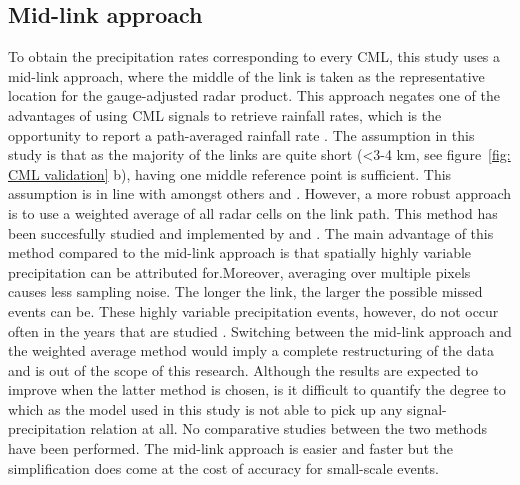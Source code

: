 \documentclass[twocolumn, 10pt, a4paper]{memoir}
\begin{document}
	\subsection{Mid-link approach} \label{sec: middle link}
	To obtain the precipitation rates corresponding to every CML, this study uses a mid-link approach, where the middle of the link is taken as the representative location for the gauge-adjusted radar product. This approach negates one of the advantages of using CML signals to retrieve rainfall rates, which is the opportunity to report a path-averaged rainfall rate \cite{Pudashine2020}. The assumption in this study is that as the majority of the links are quite short (<3-4 km, see figure~\ref{fig: CML validation} b), having one middle reference point is sufficient. This assumption is in line with amongst others  and .
	However, a more robust approach is to use a weighted average of all radar cells on the link path. This method has been succesfully studied and implemented by  and . The main advantage of this method compared to the mid-link approach is that spatially highly variable precipitation can be attributed for.Moreover, averaging over multiple pixels causes less sampling noise. The longer the link, the larger the possible missed events can be. These highly variable precipitation events, however, do not occur often in the years that are studied \cite{KNMI2022}. Switching between the mid-link approach and the weighted average method would imply a complete restructuring of the data and is out of the scope of this research. Although the results are expected to improve when the latter method is chosen, is it difficult to quantify the degree to which as the model used in this study is not able to pick up any signal-precipitation relation at all. No comparative studies between the two methods have been performed. The mid-link approach is easier and faster but the simplification does come at the cost of accuracy for small-scale events.  
	
\end{document}
